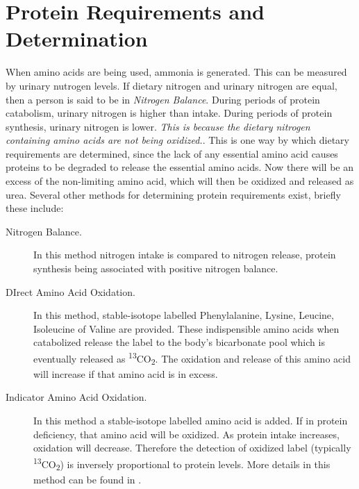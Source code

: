 \documentclass{tufte-handout}
\begin{document}
\section{Protein Requirements and Determination}
When amino acids are being used, ammonia is generated. This can be measured by urinary nutrogen levels.  If dietary nitrogen and urinary nitrogen are equal, then a person is said to be in \emph{Nitrogen Balance}.  During periods of protein catabolism, urinary nitrogen is higher than intake.  During periods of protein synthesis, urinary nitrogen is lower.  \emph{This is because the dietary nitrogen containing amino acids are not being oxidized.}.  This is one way by which dietary requirements are determined, since the lack of any essential amino acid causes proteins to be degraded to release the essential amino acids.  Now there will be an excess of the non-limiting amino acid, which will then be oxidized and released as urea.  Several other methods for determining protein requirements exist, briefly these include:

\begin{description}
\item [Nitrogen Balance.]  In this method nitrogen intake is compared to nitrogen release, protein synthesis being associated with positive nitrogen balance.
\item [DIrect Amino Acid Oxidation.]  In this method, stable-isotope labelled Phenylalanine, Lysine, Leucine, Isoleucine of Valine are provided.  These indispensible amino acids when catabolized release the label to the body's bicarbonate pool which is eventually released as \textsuperscript{13}CO\textsubscript{2}.  The oxidation and release of this amino acid will increase if that amino acid is in excess.
\item [Indicator Amino Acid Oxidation.] In this method a stable-isotope labelled amino acid is added.  If in protein deficiency, that amino acid will be oxidized.  As protein intake increases, oxidation will decrease.  Therefore the detection of oxidized label (typically \textsuperscript{13}CO\textsubscript{2}) is inversely proportional to protein levels.  More details in this method can be found in \citet{Elango2008}.
\end{description}


\end{document}
